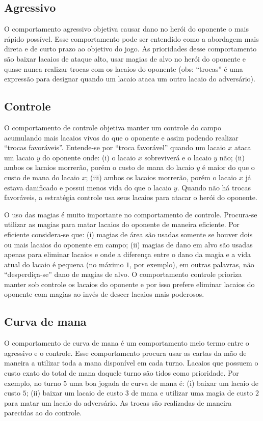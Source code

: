\documentclass[10pt]{article}
\begin{document}
\subsection{Agressivo}

O comportamento agressivo objetiva causar dano no herói do oponente o mais rápido possível. Esse comportamento pode ser entendido como a abordagem mais direta e de curto prazo ao objetivo do jogo. As prioridades desse comportamento são baixar lacaios de ataque alto, usar magias de alvo no herói do oponente e quase nunca realizar trocas com os lacaios do oponente (obs: ``trocas'' é uma expressão para designar quando um lacaio ataca um outro lacaio do adversário).

\subsection{Controle}

O comportamento de controle objetiva manter um controle do campo acumulando mais lacaios vivos do que o oponente e assim podendo realizar ``trocas favoráveis''. Entende-se por ``troca favorável'' quando um lacaio $x$ ataca um lacaio $y$ do oponente onde: (i) o lacaio $x$ sobreviverá e o lacaio $y$ não; (ii) ambos os lacaios morrerão, porém o custo de mana do lacaio $y$ é maior do que o custo de mana do lacaio $x$; (iii) ambos os lacaios morrerão, porém o lacaio $x$ já estava danificado e possui menos vida do que o lacaio $y$. Quando não há trocas favoráveis, a estratégia controle usa seus lacaios para atacar o herói do oponente.

O uso das magias é muito importante no comportamento de controle. Procura-se utilizar as magias para matar lacaios do oponente de maneira eficiente. Por eficiente considera-se que: (i) magias de área são usadas somente se houver dois ou mais lacaios do oponente em campo; (ii) magias de dano em alvo são usadas apenas para eliminar lacaios e onde a diferença entre o dano da magia e a vida atual do lacaio é pequena (no máximo $1$, por exemplo), em outras palavras, não ``desperdiça-se'' dano de magias de alvo. O comportamento controle prioriza manter sob controle os lacaios do oponente e por isso prefere eliminar lacaios do oponente com magias ao invés de descer lacaios mais poderosos.

\subsection{Curva de mana}

O comportamento de curva de mana é um comportamento meio termo entre o agressivo e o controle. Esse comportamento procura usar as cartas da mão de maneira a utilizar toda a mana disponível em cada turno. Lacaios que possuem o custo exato do total de mana daquele turno são tidos como prioridade. Por exemplo, no turno 5 uma boa jogada de curva de mana é: (i) baixar um lacaio de custo $5$; (ii) baixar um lacaio de custo $3$ de mana e utilizar uma magia de custo $2$ para matar um lacaio do adversário. As trocas são realizadas de maneira parecidas ao do controle.
\end{document}
